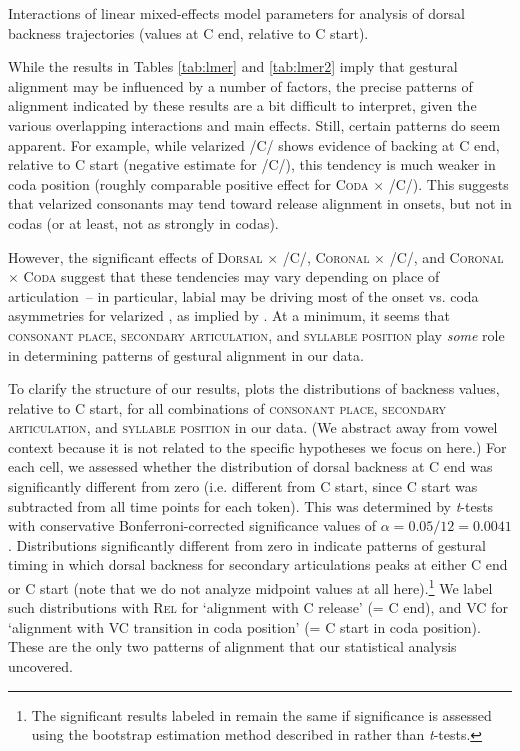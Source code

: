 \documentclass[output=paper,colorlinks,citecolor=brown]{langscibook}
\newcommand{\vel}{\ipa{ˠ}}
\begin{document}
\begin{table}
\caption{Interactions of linear mixed-effects model parameters for analysis of dorsal backness trajectories (values at C end, relative to C start).}\label{tab:lmer2}
\end{table}

%
%

While the results in Tables \ref{tab:lmer} and \ref{tab:lmer2} imply that gestural alignment may be influenced by a number of factors, the precise patterns of alignment indicated by these results are a bit difficult to interpret, given the various overlapping interactions and main effects. Still, certain patterns do seem apparent. For example, while velarized /C\vel/ shows evidence of backing at C end, relative to C start (negative estimate for /C\vel/), this tendency is much weaker in coda position (roughly comparable positive effect for \textsc{Coda $\times$ /C\vel/}). This suggests that velarized consonants may tend toward release alignment in onsets, but not in codas (or at least, not as strongly in codas).

However, the significant effects of \textsc{Dorsal $\times$ /C\vel/}, \textsc{Coronal $\times$ /C\vel/}, and \textsc{Coronal $\times$ Coda} suggest that these tendencies may vary depending on place of articulation~-- in particular, labial \ipa{/P\vel/} may be driving most of the onset vs. coda asymmetries for velarized \ipa{/C\vel/}, as implied by . At a minimum, it seems that \textsc{consonant place, secondary articulation}, and \textsc{syllable position} play \emph{some} role in determining patterns of gestural alignment in our data.

To clarify the structure of our results,  plots the distributions of backness values, relative to C start, for all combinations of \textsc{consonant place, secondary articulation}, and \textsc{syllable position} in our data. (We abstract away from vowel context because it is not related to the specific hypotheses we focus on here.) For each cell, we assessed whether the distribution of dorsal backness at C end was significantly different from zero (i.e. different from C start, since C start was subtracted from all time points for each token). This was determined by \emph{t}-tests with conservative Bonferroni-corrected significance values of $\alpha = 0.05/12 = 0.0041$. Distributions significantly different from zero in  indicate patterns of gestural timing in which dorsal backness for secondary articulations peaks at either C end or C start (note that we do not analyze midpoint values at all here).\footnote{The significant results labeled in  remain the same if significance is assessed using the bootstrap estimation method described in  rather than \emph{t}-tests.} We label such distributions with \textsc{Rel} for `alignment with C release' (= C end), and \textsc{VC} for `alignment with VC transition in coda position' (= C start in coda position). These are the only two patterns of alignment that our statistical analysis uncovered.
\end{document}
